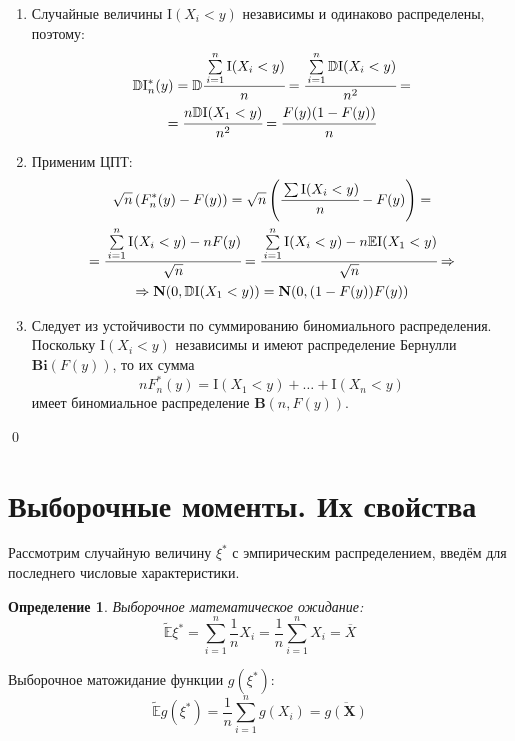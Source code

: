 \documentclass[oneside,final,14pt]{extreport}
\renewenvironment{proof}{{\bfseries Доказательство.}}{\qed}
\theoremstyle{plain}
\theoremstyle{definition}
\newtheorem*{defn}{Определение}
\theoremstyle{named}
\begin{document}
\begin{proof}
\begin{enumerate}
\begin{enumerate}[label={\arabic*)}]
        \item Случайные величины $\mathrm{I}(X_{i}<y)$ независимы и одинаково распределены, поэтому:
        \begin{multline*}
            \mathbb{D}\mathrm{I}_{n}^{*}(y)
            = \mathbb{D} \cfrac{\sum\limits_{i=1}^{n} \mathrm{I}(X_{i}<y)}{n}
            = \cfrac{\sum\limits_{i=1}^{n} \mathbb{D}\mathrm{I}(X_{i}<y)}{n^{2}}
            = \\
            = \cfrac{n\mathbb{D}\mathrm{I}(X_{1}<y)}{n^{2}}
            = \cfrac{F(y)(1-F(y))}{n}
        \end{multline*}
        \item Применим ЦПТ:
        \begin{multline*}
            \sqrt{n}\left(F_{n}^{*}(y)-F(y)\right)
            = \sqrt{n}\left(\cfrac{\sum \mathrm{I}(X_{i}<y)}{n}-F(y)\right) 
            = \\
            = \cfrac{\sum\limits_{i=1}^{n} \mathrm{I}(X_{i}<y)-n F(y)}{\sqrt{n}} 
            = \cfrac{\sum\limits_{i=1}^{n} \mathrm{I}(X_{i}<y)-n \mathbb{E}\mathrm{I}(X_{1}<y)}{\sqrt{n}} 
            \Rightarrow \\
            \Rightarrow \mathbf{N}(0, \mathbb{D}\mathrm{I}(X_{1}<y))
            = \mathbf{N}(0, (1-F(y))F(y))
        \end{multline*}
        \item Следует из устойчивости по суммированию биномиального распределения. Поскольку $\mathrm{I}\left(X_{i}<y\right)$ независимы и имеют распределение Бернулли $\mathbf{Bi}(F(y))$, то их сумма
        \begin{equation*}
            n F_{n}^{*}(y)=\mathrm{I}\left(X_{1}<y\right)+\ldots+\mathrm{I}\left(X_{n}<y\right)
        \end{equation*}
        имеет биномиальное распределение $\mathbf{B}(n, F(y))$.
    \end{enumerate}
\end{enumerate}  
\end{proof}

\section{Выборочные моменты. Их свойства}

Рассмотрим случайную величину $\xi^{*}$ с эмпирическим распределением, введём для последнего числовые характеристики.

\begin{defn}
{\it Выборочное математическое ожидание:} 
\begin{equation*}
    \tilde{\mathbb{E}} \xi^{*}=\sum\limits_{i=1}^{n} \frac{1}{n} X_{i}=\frac{1}{n} \sum\limits_{i=1}^{n} X_{i}=\overline{X}
\end{equation*}

Выборочное матожидание функции $g(\xi^{*})$:
\begin{equation*}
    \tilde{\mathbb{E}} g\left(\xi^{*}\right)=\frac{1}{n} \sum\limits_{i=1}^{n} g\left(X_{i}\right)=\overline{g(\mathbf{X})}
\end{equation*}
\end{defn}
\end{document}

